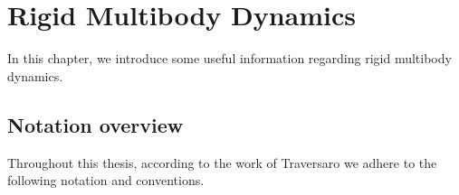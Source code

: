 \chapter{Rigid Multibody Dynamics}
\label{ch:chapter_one}%

In this chapter, we introduce some useful information regarding rigid multibody dynamics.

\section{Notation overview}
\label{sec:Notation_overview}

Throughout this thesis, according to the work of Traversaro \cite{Traversaro2017thesis} we adhere to the following notation and conventions.

